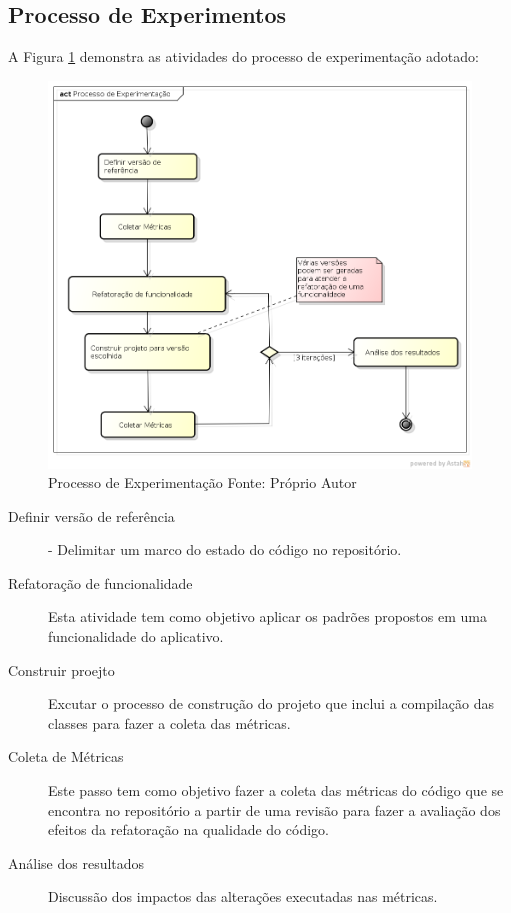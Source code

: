 \subsection{Processo de Experimentos}


A Figura \ref{processo_experimentacao} demonstra as atividades do processo de
experimentação adotado:
\begin{figure}[!h]
	\centering
	\includegraphics[scale=0.4]{img/processo_experimentacao.png}
	\caption{Processo de Experimentação Fonte: Próprio Autor}
	\label{processo_experimentacao}
\end{figure}

\begin{description}
\item[Definir versão de referência] - Delimitar um marco do estado do código no
repositório.
\item[Refatoração de funcionalidade] Esta atividade tem como objetivo aplicar os
padrões propostos em uma funcionalidade do aplicativo.
\item[Construir proejto] Excutar o processo de construção do projeto que inclui
a compilação das classes para fazer a coleta das métricas.
\item[Coleta de Métricas] Este passo tem como objetivo fazer a coleta
das métricas do código que se encontra no repositório a partir de uma revisão
para fazer a avaliação dos efeitos da refatoração na qualidade do código.
\item[Análise dos resultados] Discussão dos impactos das alterações executadas
nas métricas.
\end{description}


